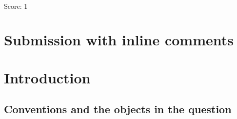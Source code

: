 \documentclass[11pt]{article}
\newcommand{\gp}{\mathrm{gp}}
\newcommand{\R}{\mathrm R}
\theoremstyle{definition}
\theoremstyle{remark}
\begin{document}
\noindent Score: 1


\newpage
\section{Submission with inline comments}


\begin{abstract}
Let \(P\) be an integral, saturated, sharp commutative monoid, let \(A_P\) be
the category of monoids under \(P\), equipped with the birhizomic topology on
\(A_P^{\mathrm{op}}\), and let \(B_P\subset A_P\) be the full subcategory of
the sharpened localizations \(P\to P[-x]^\sharp\), \(x\in P\), with the
trivial topology (all definitions are recalled in \S1).  The inclusion
induces an inverse image functor \(\pi^{-1}\) from presheaves on
\(B_P^{\mathrm{op}}\) to birhizomic sheaves, with right adjoint \(\pi_*\),
and the question answered here asks whether \(F\to\R\pi_*\pi^{-1}F\) is a
quasi-isomorphism for every presheaf of abelian groups \(F\) on
\(B_P^{\mathrm{op}}\).  We show that it is, for every \(P\), with no
finiteness hypothesis.  The proof replaces the birhizomic topology by a
finer auxiliary topology generated by binary ``sign covers''
\(\{R\to R\langle x\rangle,\ R\to R\langle -x\rangle\}\), where
\(R\langle \pm x\rangle\) is the universal monoid under \(R\) in which
\(\pm x\in R^{\gp}\) becomes nonnegative; a compactness argument shows that
every birhizomic cover is a cover for it, and the left Kan extension of
\(F\) turns out to be a sheaf for it with split exact Mayer--Vietoris
sequences, hence acyclic by an induction on the degree.  Acyclicity then
descends to the coarser birhizomic topology.
\end{abstract}

\section{Introduction}

\subsection{Conventions and the objects in the question}
\label{sec:conventions}
\end{document}
